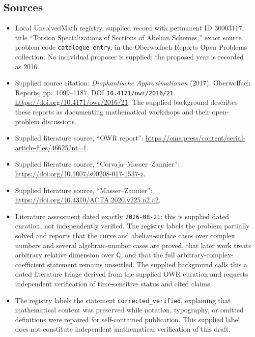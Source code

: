 \documentclass[11pt]{article}
\newcommand{\Q}{\mathbb{Q}}
\begin{document}
\subsection{Sources}
\begin{itemize}
\item Local UnsolvedMath registry, supplied record with permanent ID \(30003117\), title ``Torsion Specializations of Sections of Abelian Schemes,'' exact source problem code \texttt{catalogue entry}, in the Oberwolfach Reports Open Problems collection. No individual proposer is supplied; the proposed year is recorded as 2016.
\item Supplied source citation: \emph{Diophantische Approximationen} (2017), Oberwolfach Reports, pp.~1099--1187, DOI \texttt{10.4171/owr/2016/21}. \url{https://doi.org/10.4171/owr/2016/21}. The supplied background describes these reports as documenting mathematical workshops and their open-problem discussions.
\item Supplied literature source, ``OWR report'': \url{https://ems.press/content/serial-article-files/46625?nt=1}.
\item Supplied literature source, ``Corvaja--Masser--Zannier'': \url{https://doi.org/10.1007/s00208-017-1537-z}.
\item Supplied literature source, ``Masser--Zannier'': \url{https://doi.org/10.4310/ACTA.2020.v225.n2.a2}.
\item Literature assessment dated exactly \texttt{2026-08-21}: this is supplied dated curation, not independently verified. The registry labels the problem partially solved and reports that the curve and abelian-surface cases over complex numbers and several algebraic-number cases are proved, that later work treats arbitrary relative dimension over \(\overline{\Q}\), and that the full arbitrary-complex-coefficient statement remains unsettled. The supplied background calls this a dated literature triage derived from the supplied OWR curation and requests independent verification of time-sensitive status and cited claims.
\item The registry labels the statement \texttt{corrected\_verified}, explaining that mathematical content was preserved while notation, typography, or omitted definitions were repaired for self-contained publication. This supplied label does not constitute independent mathematical verification of this draft.
\end{itemize}
\end{document}
